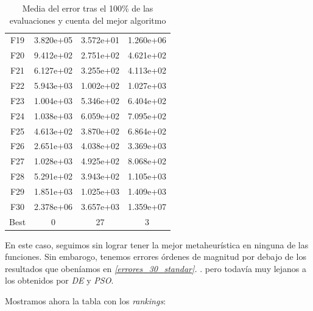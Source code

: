\documentclass[11pt]{article}
\begin{document}
\begin{table}[H]
\begin{tabular}{|c|c|c|c|}
F19  &     3.820e+05 &  3.572e+01 &  1.260e+06 \\
F20  &     9.412e+02 &  2.751e+02 &  4.621e+02 \\
F21  &     6.127e+02 &  3.255e+02 &  4.113e+02 \\
F22  &     5.943e+03 &  1.002e+02 &  1.027e+03 \\
F23  &     1.004e+03 &  5.346e+02 &  6.404e+02 \\
F24  &     1.038e+03 &  6.059e+02 &  7.095e+02 \\
F25  &     4.613e+02 &  3.870e+02 &  6.864e+02 \\
F26  &     2.651e+03 &  4.038e+02 &  3.369e+03 \\
F27  &     1.028e+03 &  4.925e+02 &  8.068e+02 \\
F28  &     5.291e+02 &  3.943e+02 &  1.105e+03 \\
F29  &     1.851e+03 &  1.025e+03 &  1.409e+03 \\
F30  &     2.378e+06 &  3.657e+03 &  1.359e+07 \\
Best &             0 &         27 &          3 \\
\hline
\end{tabular}
    \caption{Media del error tras el 100\% de las evaluaciones y cuenta del mejor algoritmo}
\end{table}

En este caso, seguimos sin lograr tener la mejor metaheurística en ninguna de las funciones. Sin embarogo, tenemos errores órdenes de magnitud por debajo de los resultados que obeníamos en \emph{\ref{errores_30_standar}. }. pero todavía muy lejanos a los obtenidos por \emph{DE} y \emph{PSO}.

Mostramos ahora la tabla con los \emph{rankings}:
\end{document}
